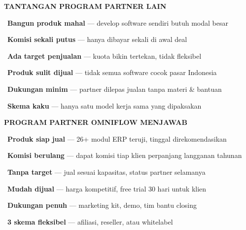 \documentclass[a4paper]{article}
\begin{document}
\noindent
\begin{minipage}[t]{0.485\textwidth}
    \colorbox{RedLight}{%
        \begin{minipage}{\dimexpr\textwidth-2\fboxsep\relax}
            {\fontsize{10}{13}\selectfont\bfseries\color{RedText} TANTANGAN PROGRAM PARTNER LAIN}
        \end{minipage}}\par
    \vspace{4pt}

    {\fontsize{9.5}{13}\selectfont\color{TextDark}%
    \textbullet\ \textbf{Bangun produk mahal} — develop software sendiri butuh modal besar\par\vspace{4pt}%
    \textbullet\ \textbf{Komisi sekali putus} — hanya dibayar sekali di awal deal\par\vspace{4pt}%
    \textbullet\ \textbf{Ada target penjualan} — kuota bikin tertekan, tidak fleksibel\par\vspace{4pt}%
    \textbullet\ \textbf{Produk sulit dijual} — tidak semua software cocok pasar Indonesia\par\vspace{4pt}%
    \textbullet\ \textbf{Dukungan minim} — partner dilepas jualan tanpa materi \& bantuan\par\vspace{4pt}%
    \textbullet\ \textbf{Skema kaku} — hanya satu model kerja sama yang dipaksakan}%
\end{minipage}%
\hfill%
\begin{minipage}[t]{0.485\textwidth}
    \colorbox{BluePrimary}{%
        \begin{minipage}{\dimexpr\textwidth-2\fboxsep\relax}
            {\fontsize{10}{13}\selectfont\bfseries\color{White} PROGRAM PARTNER OMNIFLOW MENJAWAB}
        \end{minipage}}\par
    \vspace{4pt}

    {\fontsize{9.5}{13}\selectfont\color{TextDark}%
    \textbullet\ \textbf{Produk siap jual} — 26+ modul ERP teruji, tinggal direkomendasikan\par\vspace{4pt}%
    \textbullet\ \textbf{Komisi berulang} — dapat komisi tiap klien perpanjang langganan tahunan\par\vspace{4pt}%
    \textbullet\ \textbf{Tanpa target} — jual sesuai kapasitas, status partner selamanya\par\vspace{4pt}%
    \textbullet\ \textbf{Mudah dijual} — harga kompetitif, free trial 30 hari untuk klien\par\vspace{4pt}%
    \textbullet\ \textbf{Dukungan penuh} — marketing kit, demo, tim bantu closing\par\vspace{4pt}%
    \textbullet\ \textbf{3 skema fleksibel} — afiliasi, reseller, atau whitelabel}%
\end{minipage}
\end{document}
